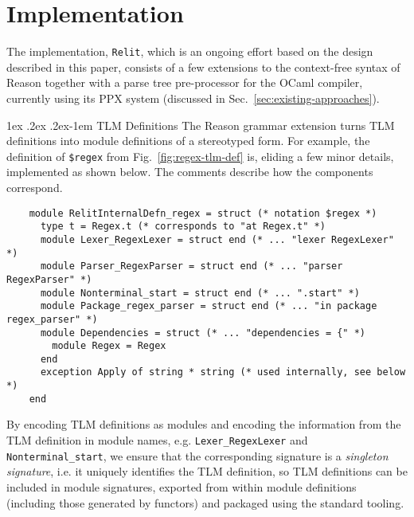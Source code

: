 \documentclass[acmsmall,screen]{acmart}
\makeatletter
\renewcommand{\paragraph}{%
  \@startsection{paragraph}{4}%
  {\z@}{1ex \@plus .2ex \@minus .2ex}{-1em}%
  {\normalfont\normalsize\bfseries}%
}
\newcommand{\li}[1]{\lstinline[basicstyle=\ttfamily\fontsize{9pt}{1em}\selectfont]{#1}}
\makeatother
\begin{document}
\section{Implementation}
\label{sec:implementation}
The implementation, \li{Relit}, which is an ongoing effort based on the design described in this paper, consists of a few extensions to the context-free syntax of Reason together with a parse tree pre-processor for the OCaml compiler, currently using its PPX system (discussed in Sec.~\ref{sec:existing-approaches}).

\paragraph{TLM Definitions} The Reason grammar extension turns TLM definitions into module definitions of a stereotyped form. For example, the definition of \li{$regex} from Fig.~\ref{fig:regex-tlm-def} is, eliding a few minor details, implemented as shown below. The comments describe how the components correspond. 

\begin{lstlisting}
    module RelitInternalDefn_regex = struct (* notation $regex *)
      type t = Regex.t (* corresponds to "at Regex.t" *)
      module Lexer_RegexLexer = struct end (* ... "lexer RegexLexer" *)
      module Parser_RegexParser = struct end (* ... "parser RegexParser" *)
      module Nonterminal_start = struct end (* ... ".start" *)
      module Package_regex_parser = struct end (* ... "in package regex_parser" *)
      module Dependencies = struct (* ... "dependencies = {" *)
        module Regex = Regex
      end
      exception Apply of string * string (* used internally, see below *)
    end
\end{lstlisting}

By encoding TLM definitions as modules and encoding the information from the TLM definition in module names, e.g. \li{Lexer_RegexLexer} and \li{Nonterminal_start}, we ensure that the corresponding signature is a \emph{singleton signature}, i.e. it uniquely identifies the TLM definition, so TLM definitions can be included in module signatures, exported from within module definitions (including those generated by functors) and packaged using the standard tooling.


\end{document}
